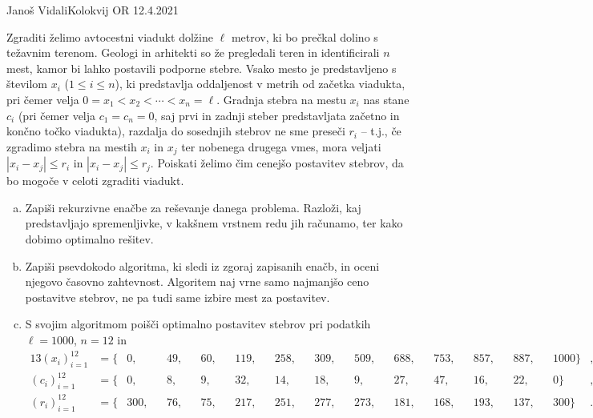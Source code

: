 \begin{naloga}{Janoš Vidali}{Kolokvij OR 12.4.2021}
\begin{vprasanje}
Zgraditi želimo avtocestni viadukt dolžine $\ell$ metrov,
ki bo prečkal dolino s težavnim terenom.
Geo\-lo\-gi in arhitekti so že pregledali teren in identificirali $n$ mest,
kamor bi lahko postavili podporne stebre.
Vsako mesto je predstavljeno s številom $x_i$ ($1 \le i \le n$),
ki predstavlja oddaljenost v metrih od začetka viadukta,
pri čemer velja $0 = x_1 < x_2 < \cdots < x_n = \ell$.
Gradnja stebra na mestu $x_i$ nas stane $c_i$
(pri čemer velja $c_1 = c_n = 0$,
saj prvi in zadnji steber predstavljata začetno in končno točko viadukta),
razdalja do sosednjih stebrov ne sme preseči $r_i$
-- t.j., če zgradimo stebra na mestih $x_i$ in $x_j$ ter nobenega drugega vmes,
mora veljati $|x_i - x_j| \le r_i$ in $|x_i - x_j| \le r_j$.
Poiskati želimo čim cenejšo postavitev stebrov,
da bo mogoče v celoti zgraditi viadukt.

\begin{enumerate}[(a)]
\item Zapiši rekurzivne enačbe za reševanje danega problema.
Razloži, kaj pred\-stav\-lja\-jo spremenljivke,
v kakšnem vrstnem redu jih računamo,
ter kako dobimo optimalno rešitev.

\item Zapiši psevdokodo algoritma, ki sledi iz zgoraj zapisanih enačb,
in oceni njegovo časovno zahtevnost.
Algoritem naj vrne samo najmanjšo ceno postavitve stebrov,
ne pa tudi same izbire mest za postavitev.

\item S svojim algoritmom poišči optimalno postavitev stebrov pri podatkih $\ell = 1000$, $n = 12$ in
\begin{alignat*}{13}
(x_i)_{i=1}^{12} &= \{&{} 0, &&{} 49, &&{} 60, &&{} 119, &&{} 258, &&{} 309, &&{} 509, &&{} 688, &&{} 753, &&{} 857, &&{} 887, &&{} 1000\} &, \\
(c_i)_{i=1}^{12} &= \{&{} 0, &&{} 8, &&{} 9, &&{} 32, &&{} 14, &&{} 18, &&{} 9, &&{} 27, &&{} 47, &&{} 16, &&{} 22, &&{} 0\} &, \\
(r_i)_{i=1}^{12} &= \{&{} 300, &&{} 76, &&{} 75, &&{} 217, &&{} 251, &&{} 277, &&{} 273, &&{} 181, &&{} 168, &&{} 193, &&{} 137, &&{} 300\} &.
\end{alignat*}
\end{enumerate}
\end{vprasanje}


\end{naloga}
